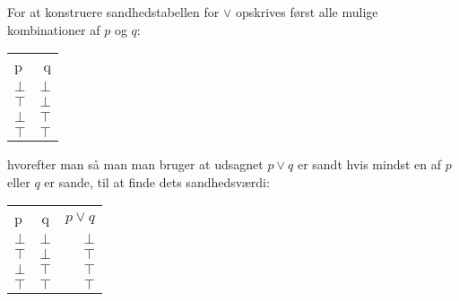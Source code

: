\begin{eks}
    For at konstruere sandhedstabellen for $\lor$ opskrives først alle mulige kombinationer af $p$ og $q$:
    \begin{center}
    \begin{tabular}{|l|r|}
        \hline
        p & q \\
        $\bot$ & $\bot$ \\
        \hline
        $\top$ & $\bot$ \\
        \hline
        $\bot$ & $\top$ \\
        \hline
        $\top$ & $\top$ \\
        \hline
    \end{tabular}
    \end{center}
    hvorefter man så man man bruger at udsagnet $p \lor q$ er sandt hvis mindst en af $p$ eller $q$ er sande,
    til at finde dets sandhedsværdi:
    \begin{center}
    \begin{tabular}{|l|c|r|}
        \hline
        p & q & $p \lor q$ \\
        $\bot$ & $\bot$ & $\bot$ \\
        \hline
        $\top$ & $\bot$ & $\top$ \\
        \hline
        $\bot$ & $\top$ & $\top$ \\
        \hline
        $\top$ & $\top$ & $\top$ \\
        \hline
    \end{tabular}
    \end{center}

\end{eks}


\ifdefined\startSamlet\fi

